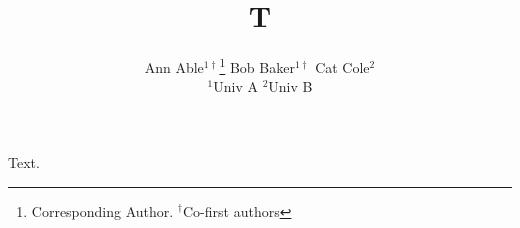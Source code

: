 \documentclass{article}
\title{T}
\author{Ann Able$^{1\dagger}$\thanks{Corresponding Author. $^{\dagger}$Co-first authors}\quad
Bob Baker$^{1\dagger}$ \quad Cat Cole$^{2}$ \\
$^{1}$Univ A \quad $^{2}$Univ B}
\date{}
\begin{document}
\maketitle
Text.
\end{document}

